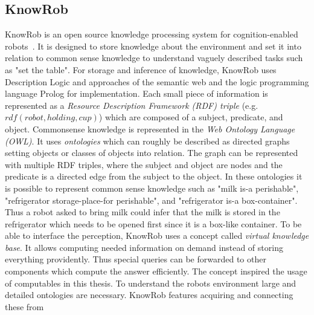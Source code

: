 \documentclass[a4paper,11pt]{article}
\begin{document}
\subsection{KnowRob}
\label{sec:knowrob}
KnowRob is an open source knowledge processing system for
cognition-enabled robots~\cite{KnowRob,KnowRob-Representation}. It is
designed to store knowledge about the environment and set it into
relation to common sense knowledge to understand vaguely described
tasks such as "set the table". For storage and inference of knowledge,
KnowRob uses Description Logic and approaches of the semantic web
and the logic
programming language Prolog for implementation. Each small piece of
information is represented as a \emph{Resource Description Framework
  (RDF) triple} (e.g. $rdf(robot, holding, cup)$) which are composed
of a subject, predicate, and object. Commonsense knowledge is
represented in the \emph{Web Ontology Language (OWL)}. It uses
\emph{ontologies} which can roughly be described as directed graphs
setting objects or classes of objects into relation. The graph can be
represented with multiple RDF triples, where the subject and object
are nodes and the predicate is a directed edge from the subject to the
object. In these ontologies it is possible to represent common sense
knowledge such as "milk is-a perishable", "refrigerator
storage-place-for perishable", and "refrigerator is-a
box-container". Thus a robot asked to bring milk could infer that the
milk is stored in the refrigerator which needs to be opened first
since it is a box-like container. To be able to interface the
perception, KnowRob uses a concept called
\emph{virtual knowledge base}. It allows computing needed information
on demand instead of storing everything providently. Thus special
queries can be forwarded to other components which compute the answer
efficiently.
The concept inspired the usage of computables in this thesis.
To understand the robots environment large and detailed ontologies are
necessary. KnowRob features acquiring and connecting these from
\end{document}
